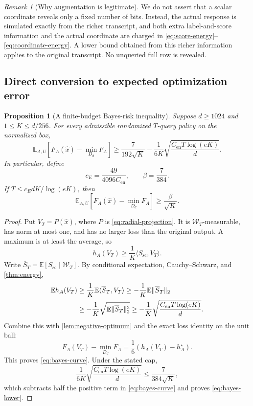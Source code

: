\documentclass[11pt]{article}
\numberwithin{equation}{section}
\newtheorem{proposition}[proposition]{Proposition}
\theoremstyle{definition}
\theoremstyle{remark}
\newtheorem{remark}[remark]{Remark}
\newcommand{\E}{\mathbb E}
\newcommand{\cW}{\mathcal W}
\newcommand{\Cen}{C_{\mathrm{en}}}
\DeclarePairedDelimiter{\norm}{\lVert}{\rVert}
\newcommand{\ip}[2]{\langle #1,#2\rangle}
\begin{document}
\begin{remark}[Why augmentation is legitimate]
We do not assert that a scalar coordinate reveals only a fixed number of bits. Instead, the actual response is simulated exactly from the richer transcript, and both extra label-and-score information and the actual coordinate are charged in \eqref{eq:score-energy}--\eqref{eq:coordinate-energy}. A lower bound obtained from this richer information applies to the original transcript. No unqueried full row is revealed.
\end{remark}

\subsection{Direct conversion to expected optimization error}

\begin{proposition}[A finite-budget Bayes-risk inequality]\label{prop:bayes}
Suppose $d\ge1024$ and $1\le K\le d/256$. For every admissible randomized $T$-query policy on the normalized box,
\begin{equation}\label{eq:bayes-curve}
\E_{A,U}[F_A(\widehat x)-\min_{D_d}F_A]
\ge\frac7{192\sqrt K}
-\frac1{6K}\sqrt{\frac{\Cen T\log(eK)}d}.
\end{equation}
In particular, define
\begin{equation}\label{eq:bayes-constants}
c_E=\frac{49}{4096\Cen},\qquad \beta=\frac7{384}.
\end{equation}
If $T\le c_EdK/\log(eK)$, then
\begin{equation}\label{eq:bayes-lower}
\E_{A,U}[F_A(\widehat x)-\min_{D_d}F_A]\ge\frac\beta{\sqrt K}.
\end{equation}
\end{proposition}
\begin{proof}
Put $V_T=P(\widehat x)$, where $P$ is \eqref{eq:radial-projection}. It is $\cW_T$-measurable, has norm at most one, and has no larger loss than the original output. A maximum is at least the average, so
\[
h_A(V_T)\ge\frac1K\ip{S_{\mathrm{sc}}}{V_T}.
\]
Write $\overline S_T=\E[S_{\mathrm{sc}}\mid\cW_T]$. By conditional expectation, Cauchy--Schwarz, and \cref{thm:energy},
\begin{align}
\E h_A(V_T)
&\ge\frac1K\E\ip{\overline S_T}{V_T}
\ge-\frac1K\E\norm{\overline S_T}_2\notag\\
&\ge-\frac1K\sqrt{\E\norm{\overline S_T}_2^2}
\ge-\frac1K\sqrt{\frac{\Cen T\log(eK)}d}.\label{eq:mean-output}
\end{align}
Combine this with \cref{lem:negative-optimum} and the exact loss identity on the unit ball:
\[
F_A(V_T)-\min_{D_d}F_A=\frac16(h_A(V_T)-h_A^\star).
\]
This proves \eqref{eq:bayes-curve}. Under the stated cap,
\[
\frac1{6K}\sqrt{\frac{\Cen T\log(eK)}d}
\le\frac7{384\sqrt K},
\]
which subtracts half the positive term in \eqref{eq:bayes-curve} and proves \eqref{eq:bayes-lower}.
\end{proof}
\end{document}
